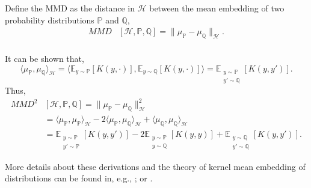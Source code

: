 \begin{definition}
  Define the MMD as the distance in $\mathcal{H}$ between the mean embedding of two probability distributions $\mathbb{P}$ and $\mathbb{Q}$,
$$
 \begin{aligned}
  MMD&[\mathcal{H},\mathbb{P},\mathbb{Q}] = \|\mu_{\mathbb{P}}-\mu_{\mathbb{Q}}\|_{\mathcal{H}}. \\
 \end{aligned}
$$
\end{definition}

It can be shown that,
$$
  \langle \mu_{\mathbb{P}}, \mu_{\mathbb{Q}} \rangle_{\mathcal{H}} = 
     \langle \mathbb{E}_{y\sim \mathbb{P}}\left[ K(y,\cdot) \right] , 
             \mathbb{E}_{y\sim \mathbb{Q}}\left[ K(y,\cdot) \right] \rangle =
     \mathbb{E}_{\substack{y\sim \mathbb{P} \\ y'\sim \mathbb{Q}}} \left[ K(y,y') \right].
$$
Thus,
$$
 \begin{aligned}
  MMD^2&[\mathcal{H},\mathbb{P},\mathbb{Q}] = \|\mu_{\mathbb{P}}-\mu_{\mathbb{Q}}\|^2_{\mathcal{H}} \\
   &= \langle \mu_{\mathbb{P}}, \mu_{\mathbb{P}} \rangle_{\mathcal{H}}
   -2 \langle \mu_{\mathbb{P}}, \mu_{\mathbb{Q}} \rangle_{\mathcal{H}}
   + \langle \mu_{\mathbb{Q}}, \mu_{\mathbb{Q}} \rangle_{\mathcal{H}} \\
    &= \mathbb{E}_{\substack{y\sim \mathbb{P} \\ y'\sim \mathbb{P}}}   \left[ K(y,y') \right]
    -2\mathbb{E}_{\substack{y\sim \mathbb{P} \\ y\sim \mathbb{Q}}} \left[ K(y,y) \right]
    +\mathbb{E}_{\substack{y\sim \mathbb{Q} \\ y'\sim \mathbb{Q}}} \left[ K(y,y') \right].
 \end{aligned}
$$

More details about these derivations and the theory of kernel mean embedding of distributions can be found in, e.g., \cite{muandet2017}; or \cite{song2008}.

